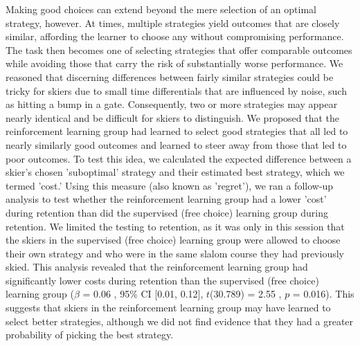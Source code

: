 \documentclass[pdflatex,sn-mathphys-num]{sn-jnl}%
\theoremstyle{thmstyleone}%
\theoremstyle{thmstyletwo}%
\theoremstyle{thmstylethree}%
\begin{document}
Making good choices can extend beyond the mere selection of an optimal strategy, however. At times, multiple strategies yield outcomes that are closely similar, affording the learner to choose any without compromising performance. The task then becomes one of selecting strategies that offer comparable outcomes while avoiding those that carry the risk of substantially worse performance. We reasoned that discerning differences between fairly similar strategies could be tricky for skiers due to small time differentials that are influenced by noise, such as hitting a bump in a gate. Consequently, two or more strategies may appear nearly identical and be difficult for skiers to distinguish. We proposed that the reinforcement learning group had learned to select good strategies that all led to nearly similarly good outcomes and learned to steer away from those that led to poor outcomes. To test this idea, we calculated the expected difference between a skier's chosen 'suboptimal' strategy and their estimated best strategy, which we termed 'cost.' Using this measure (also known as 'regret'), we ran a follow-up analysis to test whether the reinforcement learning group had a lower 'cost' during retention than did the supervised (free choice) learning group during retention. We limited the testing to retention, as it was only in this session that the skiers in the supervised (free choice) learning group were allowed to choose their own strategy and who were in the same slalom course they had previously skied. This analysis revealed that the reinforcement learning group had significantly lower costs during retention than the supervised (free choice) learning group ($\beta$ = 0.06 , 95\% CI [0.01, 0.12], $t$(30.789) = 2.55 , $p$ = 0.016). This suggests that skiers in the reinforcement learning group may have learned to select better strategies, although we did not find evidence that they had a greater probability of picking the best strategy.
\end{document}
